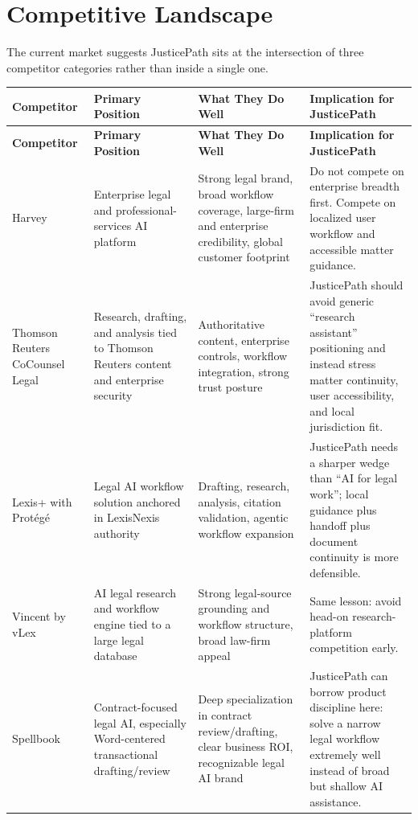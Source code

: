 \documentclass[11pt]{article}
\begin{document}
\section*{Competitive Landscape}
The current market suggests JusticePath sits at the intersection of three competitor categories rather than inside a single one.

\begin{longtable}{p{} p{} p{} p{}}
\toprule
\textbf{Competitor} & \textbf{Primary Position} & \textbf{What They Do Well} & \textbf{Implication for JusticePath} \\
\midrule
\endfirsthead
\toprule
\textbf{Competitor} & \textbf{Primary Position} & \textbf{What They Do Well} & \textbf{Implication for JusticePath} \\
\midrule
\endhead

Harvey & Enterprise legal and professional-services AI platform & Strong legal brand, broad workflow coverage, large-firm and enterprise credibility, global customer footprint & Do not compete on enterprise breadth first. Compete on localized user workflow and accessible matter guidance. \\

Thomson Reuters CoCounsel Legal & Research, drafting, and analysis tied to Thomson Reuters content and enterprise security & Authoritative content, enterprise controls, workflow integration, strong trust posture & JusticePath should avoid generic ``research assistant'' positioning and instead stress matter continuity, user accessibility, and local jurisdiction fit. \\

Lexis+ with Prot\'eg\'e & Legal AI workflow solution anchored in LexisNexis authority & Drafting, research, analysis, citation validation, agentic workflow expansion & JusticePath needs a sharper wedge than ``AI for legal work''; local guidance plus handoff plus document continuity is more defensible. \\

Vincent by vLex & AI legal research and workflow engine tied to a large legal database & Strong legal-source grounding and workflow structure, broad law-firm appeal & Same lesson: avoid head-on research-platform competition early. \\

Spellbook & Contract-focused legal AI, especially Word-centered transactional drafting/review & Deep specialization in contract review/drafting, clear business ROI, recognizable legal AI brand & JusticePath can borrow product discipline here: solve a narrow legal workflow extremely well instead of broad but shallow AI assistance. \\


\end{longtable}
\end{document}
